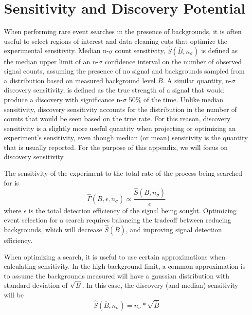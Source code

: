 \documentclass[/main.tex]{subfiles}
\begin{document}
\onlyinsubfile{\appendix}
\chapter{Sensitivity and Discovery Potential}
\label{app:sens}

When performing rare event searches in the presence of backgrounds, it is often useful to select regions of interest and data cleaning cuts that optimize the experimental sensitivity.
Median n-$\sigma$ count sensitivity, $\hat{S}(\overline{B}, n_\sigma)$ is defined as the median upper limit of an n-$\sigma$ confidence interval on the number of observed signal counts, assuming the presence of no signal and backgrounds sampled from a distribution based on measured background level $\overline{B}$.
A similar quantity, n-$\sigma$ discovery sensitivity, is defined as the true strength of a signal that would produce a discovery with significance n-$\sigma$ 50\% of the time.
Unlike median sensitivity, discovery sensitivity accounts for the distribution in the number of counts that would be seen based on the true rate.
For this reason, discovery sensitivity is a slightly more useful quantity when projecting or optimizing an experiment's sensitivity, even though median (or mean) sensitivity is the quantity that is usually reported.
For the purpose of this appendix, we will focus on discovery sensitivity.

The sensitivity of the experiment to the total rate of the process being searched for is
\begin{equation}
  \hat{\Gamma}(\overline{B}, \epsilon, n_\sigma)\propto\frac{\hat{S}(\overline{B}, n_\sigma)}{\epsilon}
\end{equation}
where $\epsilon$ is the total detection efficiency of the signal being sought.
Optimizing event selection for a search requires balancing the tradeoff between reducing backgrounds, which will decrease $\hat{S}(\overline{B})$, and improving signal detection efficiency.

When optimizing a search, it is useful to use certain approximations when calculating sensitivity.
In the high background limit, a common approximation is to assume the backgrounds measured will have a gaussian distribution with standard deviation of $\sqrt{\overline{B}}$.
In this case, the discovery (and median) sensitivity will be
\begin{equation}
  \hat{S}(\overline{B}, n_\sigma)=n_\sigma * \sqrt{\overline{B}}
\end{equation}
\end{document}

